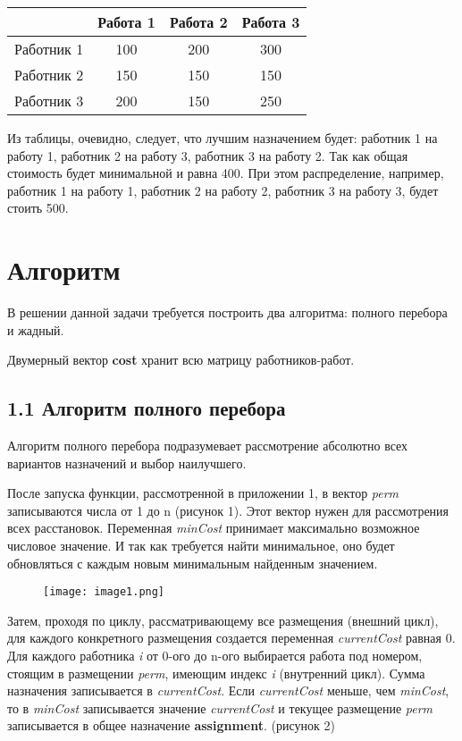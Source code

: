 \documentclass[]{article}
\begin{document}
\begin{table}[h]
    \centering
    \begin{tabular}{|c|c|c|c|}
    \hline
    & Работа 1 & Работа 2 & Работа 3 \\ \hline
    Работник 1 & 100 & 200 & 300 \\ \hline
    Работник 2 & 150 & 150 & 150 \\ \hline
    Работник 3 & 200 & 150 & 250 \\ \hline
    \end{tabular}
    \caption{}
    \label{tab:work_and_workers}
\end{table}

Из таблицы, очевидно, следует, что лучшим назначением будет: работник 1
на работу 1, работник 2 на работу 3, работник 3 на работу 2. Так как
общая стоимость будет минимальной и равна 400. При этом распределение,
например, работник 1 на работу 1, работник 2 на работу 2, работник 3 на
работу 3, будет стоить 500.
\newpage

\hypertarget{Алгоритм}{%
\section{\textbf{Алгоритм}}\label{Алгоритм}}

В решении данной задачи требуется построить два алгоритма: полного
перебора и жадный.

Двумерный вектор \textbf{cost} хранит всю матрицу работников-работ.

\hypertarget{Алгоритм полного перебора}{%
\subsection{\textbf{1.1 Алгоритм полного
перебора}}\label{Алгоритм полного перебора}}

Алгоритм полного перебора подразумевает рассмотрение абсолютно всех
вариантов назначений и выбор наилучшего.

После запуска функции, рассмотренной в приложении 1, в вектор
\emph{perm} записываются числа от 1 до n (рисунок 1). Этот вектор нужен
для рассмотрения всех расстановок. Переменная \emph{minCost} принимает
максимально возможное числовое значение. И так как требуется найти
минимальное, оно будет обновляться с каждым новым минимальным найденным
значением.


\begin{figure}
    \centering
    \texttt{[image: image1.png]}
    \caption{}
    \label{fig:enter-label}
\end{figure}
\newpage
Затем, проходя по циклу, рассматривающему все размещения (внешний цикл),
для каждого конкретного размещения создается переменная
\emph{currentCost} равная 0. Для каждого работника \emph{i} от 0-ого до
n-ого выбирается работа под номером, стоящим в размещении \emph{perm},
имеющим индекс \emph{i} (внутренний цикл). Сумма назначения записывается
в \emph{currentCost}. Если \emph{currentCost} меньше, чем \emph{minCost},
то в \emph{minCost} записывается значение \emph{currentCost} и текущее
размещение \emph{perm} записывается в общее назначение
\textbf{assignment}. (рисунок 2)
\end{document}
